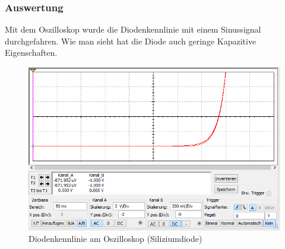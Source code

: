 \documentclass[12pt,a4paper]{article}
\begin{document}
\subsubsection{Auswertung}
Mit dem Oszilloskop wurde die Diodenkennlinie mit einem Sinussignal durchgefahren.
Wie man sieht hat die Diode auch geringe Kapazitive Eigenschaften.
\begin{figure}[H] 
  \centering
    \includegraphics[trim = 0mm 0mm 0mm 0mm, clip, scale = 1]{3_1_kennlinie.PNG}
  	\caption[Diodenkennlinie am Oszilloskop (Siliziumdiode)]{Diodenkennlinie am Oszilloskop (Siliziumdiode)}
  \label{fig:Diodenkennlinie_Oszilloskop_Siliziumdiode}
\end{figure}
\end{document}

